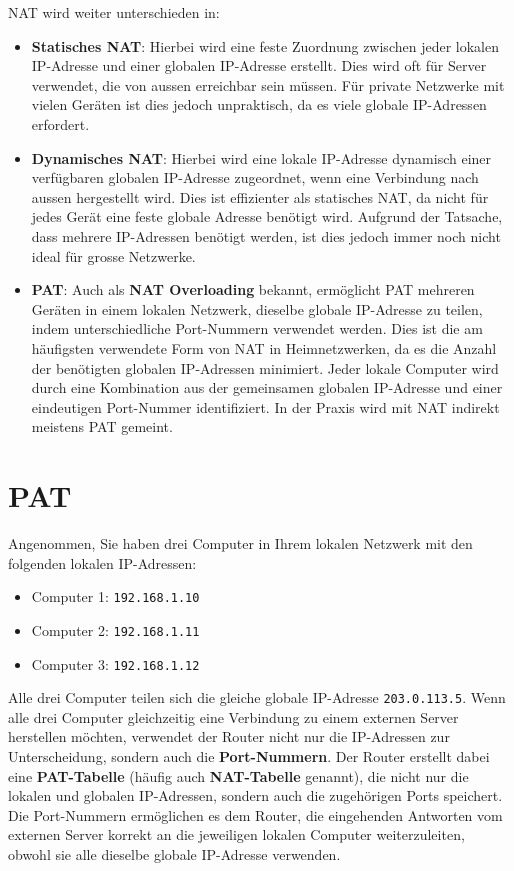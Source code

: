 \gls{NAT} wird weiter unterschieden in:
\begin{itemize}
    \item \textbf{Statisches \acrshort{NAT}}: Hierbei wird eine feste Zuordnung zwischen jeder lokalen \gls{IP}-Adresse und einer globalen \gls{IP}-Adresse erstellt. Dies wird oft für Server verwendet, die von aussen erreichbar sein müssen. Für private Netzwerke mit vielen Geräten ist dies jedoch unpraktisch, da es viele globale \gls{IP}-Adressen erfordert.
    \item \textbf{Dynamisches \acrshort{NAT}}: Hierbei wird eine lokale \gls{IP}-Adresse dynamisch einer verfügbaren globalen \gls{IP}-Adresse zugeordnet, wenn eine Verbindung nach aussen hergestellt wird. Dies ist effizienter als statisches \gls{NAT}, da nicht für jedes Gerät eine feste globale Adresse benötigt wird. Aufgrund der Tatsache, dass mehrere \gls{IP}-Adressen benötigt werden, ist dies jedoch immer noch nicht ideal für grosse Netzwerke.
    \item \textbf{\gls{PAT}}: Auch als \textbf{\acrshort{NAT} Overloading} bekannt, ermöglicht \gls{PAT} mehreren Geräten in einem lokalen Netzwerk, dieselbe globale \gls{IP}-Adresse zu teilen, indem unterschiedliche Port-Nummern verwendet werden. Dies ist die am häufigsten verwendete Form von \gls{NAT} in Heimnetzwerken, da es die Anzahl der benötigten globalen \gls{IP}-Adressen minimiert. Jeder lokale Computer wird durch eine Kombination aus der gemeinsamen globalen \gls{IP}-Adresse und einer eindeutigen Port-Nummer identifiziert. In der Praxis wird mit \gls{NAT} indirekt meistens \gls{PAT} gemeint.
\end{itemize}

\section{\texorpdfstring{\acrfull{PAT}}{Port Address Translation (PAT)}}
Angenommen, Sie haben drei Computer in Ihrem lokalen Netzwerk mit den folgenden lokalen \gls{IP}-Adressen:
\begin{itemize}
    \item Computer 1: \texttt{192.168.1.10}
    \item Computer 2: \texttt{192.168.1.11}
    \item Computer 3: \texttt{192.168.1.12}
\end{itemize}
Alle drei Computer teilen sich die gleiche globale \gls{IP}-Adresse \texttt{203.0.113.5}. Wenn alle drei Computer gleichzeitig eine Verbindung zu einem externen Server herstellen möchten, verwendet der Router nicht nur die \gls{IP}-Adressen zur Unterscheidung, sondern auch die \textbf{Port-Nummern}. Der Router erstellt dabei eine \textbf{\gls{PAT}-Tabelle} (häufig auch \textbf{\gls{NAT}-Tabelle} genannt), die nicht nur die lokalen und globalen \gls{IP}-Adressen, sondern auch die zugehörigen Ports speichert. Die Port-Nummern ermöglichen es dem Router, die eingehenden Antworten vom externen Server korrekt an die jeweiligen lokalen Computer weiterzuleiten, obwohl sie alle dieselbe globale \gls{IP}-Adresse verwenden.

